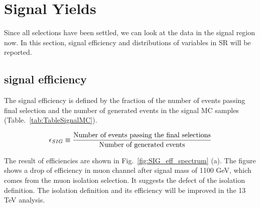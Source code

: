 \section{Signal Yields}
Since all selections have been settled, we can look at the data in the signal region now. In this section, signal efficiency and distributions of variables in SR will be reported. 

\subsection{signal efficiency}
The signal efficiency is defined by the fraction of the number of events passing final selection and the number of generated events in the signal MC samples (Table.~\ref{tab:TableSignalMC}). 

\begin{align}
  \label{eq:SIGeff}
  \epsilon_{SIG}\equiv \frac{\textup{Number of events passing the final selections}}{\textup{Number of generated events}}
\end{align}

The result of efficiencies are shown in Fig.~\ref{fig:SIG_eff_spectrum} (a). The figure shows a drop of efficiency in muon channel after signal mass of 1100 GeV, which comes from the muon isolation selection. It suggests the defect of the isolation definition. The isolation definition and its efficiency will be improved in the 13 TeV analysis.

